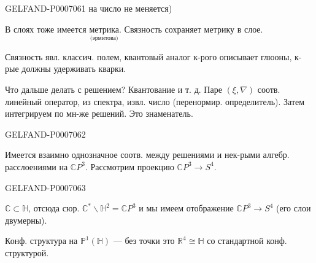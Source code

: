 \begin{GelfandAdjacentEvidence}{GELFAND-P000706}{1}
на число не меняется)

В слоях тоже имеется
\(\underset{\text{(эрмитова)}}{\text{метрика}}\).
Связность сохраняет метрику в слое.

Связность явл. классич. полем, квантовый аналог к-рого описывает глюоны, к-рые должны удерживать кварки.

Что дальше делать с решением? Квантование и т. д.
Паре \((\xi,\nabla)\) соотв. линейный оператор, из спектра, извл.
число (перенормир. определитель). Затем интегрируем по мн-же решений.
Это знаменатель.
\end{GelfandAdjacentEvidence}
\begin{GelfandAdjacentEvidence}{GELFAND-P000706}{2}


Имеется взаимно однозначное соотв. между решениями и нек-рыми алгебр. расслоениями на \(\mathbb C P^3\). Рассмотрим проекцию \(\mathbb C P^3\to S^4\).

\end{GelfandAdjacentEvidence}
\begin{GelfandAdjacentEvidence}{GELFAND-P000706}{3}


\(\mathbb C\subset\mathbb H\), отсюда сюр.
\(\mathbb C^*\backslash\mathbb H^2=\mathbb C P^3\)
и мы имеем отображение \(\mathbb C P^3\to S^4\) (его слои двумерны).

Конф. структура на \(\mathbb P^1(\mathbb H)\) --- без точки это
\(\mathbb R^4\cong\mathbb H\) со стандартной конф. структурой.
\end{GelfandAdjacentEvidence}
